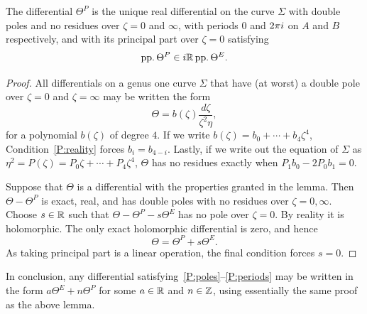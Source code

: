 \documentclass{article}
\begin{document}
\begin{lem}\label{lem:theta2_characterisation}
The differential $\Theta^P$ is the unique real differential on the curve $\Sigma$ with double poles and no residues over $\zeta=0$ and $\infty$, with periods $0$ and $2\pi i$ on $A$ and $B$ respectively, and with its principal part over $\zeta=0$ satisfying
\[
\operatorname{pp.} \Theta^P \in i \mathbb{R} \operatorname{pp.} \Theta^E.
\]
\begin{proof}
All differentials on a genus one curve $\Sigma$ that have (at worst) a double pole over $\zeta=0$ and $\zeta=\infty$ may be written the form
\[
\Theta = b(\zeta)\frac{d\zeta}{\zeta^2\eta},
\]
for a polynomial $b(\zeta)$ of degree $4$. If we write $b(\zeta) = b_0 + \cdots + b_4 \zeta^4$, Condition~\ref{P:reality} forces $b_i = b_{4-i}$. Lastly, if we write out the equation of $\Sigma$ as $\eta^2 = P(\zeta) = P_0 \zeta + \cdots + P_4 \zeta^4$, $\Theta$ has no residues exactly when $P_1b_0 - 2P_0b_1 = 0$. 

Suppose that $\Theta$ is a differential with the properties granted in the lemma. Then $\Theta-\Theta^P$ is exact, real, and has double poles with no residues over $\zeta = 0,\infty$. Choose $s\in\mathbb{R}$ such that $\Theta-\Theta^P - s\Theta^E$ has no pole over $\zeta = 0$. By reality it is holomorphic. The only exact holomorphic differential is zero, and hence
\[
\Theta = \Theta^P + s \Theta^E.
\]
As taking principal part is a linear operation, the final condition forces $s=0$.
\end{proof}
\end{lem}

In conclusion, any differential satisfying~\ref{P:poles}--\ref{P:periods} may be written in the form $a \Theta^E + n \Theta^P$ for some $a\in\mathbb{R}$ and $n\in\mathbb{Z}$, using essentially the same proof as the above lemma. 
\end{document}
